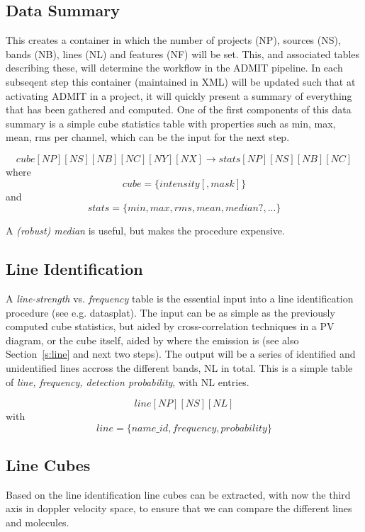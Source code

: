 \documentclass[preprint]{aastex} %
\begin{document}
\subsection{Data Summary}

This creates a container in which the number of projects (NP),
sources (NS), bands (NB), lines (NL) and features (NF) will be set. 
This, and 
associated tables describing these, will determine the workflow in the
ADMIT pipeline. In each subseqent step this container (maintained in XML) will
be updated such that at activating ADMIT in a project, it will quickly
present a summary of everything that has been gathered and computed. One of
the first components of this data summary is a 
simple cube statistics table with properties such as 
min, max, mean, rms per channel, which can be the input for the next step.

$$
cube[NP][NS][NB][NC][NY][NX] \rightarrow stats[NP][NS][NB][NC]
$$
where 
$$
     cube = \{ intensity [, mask] \}
$$
and
$$
stats = \{min,max,rms,mean,median?,...\}
$$

A {\it (robust) median} is useful, but makes the procedure expensive.


\subsection{Line Identification}

A {\it line-strength} vs. {\it frequency} table is the essential input
into a line identification procedure (see e.g. datasplat).
The input can be as simple as the previously computed cube statistics, 
but aided by cross-correlation techniques in a PV diagram, or the cube itself,
aided by where the emission is (see also Section~\ref{s:line} and next two steps).
The output will be a series of identified and unidentified lines accross the different
bands, NL in total. This is a simple table of 
{\it line, frequency, detection probability}, with NL entries.

$$
    line[NP][NS][NL]
$$
with
$$
    line = \{name\_id, frequency, probability\}
$$

\subsection{Line Cubes}

Based on the line identification  line cubes can be extracted,
with now the third axis in doppler velocity space, to ensure
that we can compare the different lines and molecules.
\end{document}
